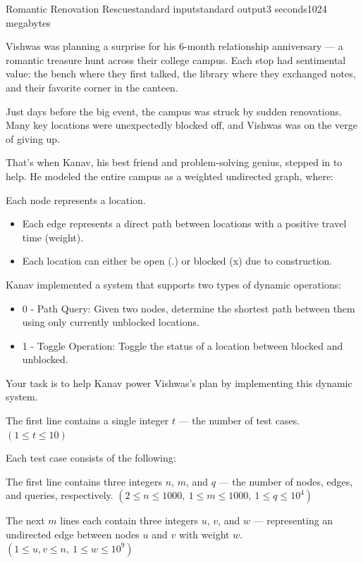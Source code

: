 \begin{problem}{Romantic Renovation Rescue}{standard input}{standard output}{3 seconds}{1024 megabytes}

Vishwas was planning a surprise for his 6-month relationship anniversary --- a romantic treasure hunt across their college campus. Each stop had sentimental value: the bench where they first talked, the library where they exchanged notes, and their favorite corner in the canteen.

Just days before the big event, the campus was struck by sudden renovations. Many key locations were unexpectedly blocked off, and Vishwas was on the verge of giving up.

That's when Kanav, his best friend and problem-solving genius, stepped in to help. He modeled the entire campus as a weighted undirected graph, where:

 Each node represents a location.
\begin{itemize}
\item Each edge represents a direct path between locations with a positive travel time (weight).
\item Each location can either be open (.) or blocked (x) due to construction.
\end{itemize}

Kanav implemented a system that supports two types of dynamic operations:
\begin{itemize}
\item 0 - Path Query: Given two nodes, determine the shortest path between them using only currently unblocked locations.
\item 1 - Toggle Operation: Toggle the status of a location between blocked and unblocked.
\end{itemize}

Your task is to help Kanav power Vishwas's plan by implementing this dynamic system.

\InputFile
The first line contains a single integer $t$ --- the number of test cases.
$(1 \le t \le 10)$

Each test case consists of the following:

The first line contains three integers $n$, $m$, and $q$ --- the number of nodes, edges, and queries, respectively.
$(2 \le n  \le 1000,\ 1 \le m \le 1000,\ 1 \le q \le 10^4)$

The next $m$ lines each contain three integers $u$, $v$, and $w$ --- representing an undirected edge between nodes $u$ and $v$ with weight $w$.
$(1 \le u, v \le n,\ 1 \le w \le 10^9)$


\end{problem}
